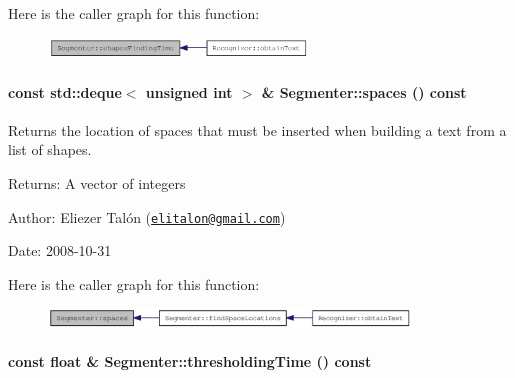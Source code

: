 Here is the caller graph for this function:\nopagebreak
\begin{figure}[H]
\begin{center}
\leavevmode
\includegraphics[width=196pt]{class_segmenter_8d7304b35b1891b1c7154a3ac2ff2c4b_icgraph}
\end{center}
\end{figure}
\hypertarget{class_segmenter_eed49de2d6548ae8016bf6c9c78cec99}{
\paragraph[{spaces}]{\setlength{\rightskip}{0pt plus 5cm}const std::deque$<$ unsigned int $>$ \& Segmenter::spaces () const}\hfill}
\label{class_segmenter_eed49de2d6548ae8016bf6c9c78cec99}


Returns the location of spaces that must be inserted when building a text from a list of shapes. 

\begin{Desc}
\item[Returns:]A vector of integers\end{Desc}
\begin{Desc}
\item[Author:]Eliezer Talón (\href{mailto:elitalon@gmail.com}{\tt elitalon@gmail.com}) \end{Desc}
\begin{Desc}
\item[Date:]2008-10-31 \end{Desc}


Here is the caller graph for this function:\nopagebreak
\begin{figure}[H]
\begin{center}
\leavevmode
\includegraphics[width=273pt]{class_segmenter_eed49de2d6548ae8016bf6c9c78cec99_icgraph}
\end{center}
\end{figure}
\hypertarget{class_segmenter_9114d0f3934b43478fb55077b7722d3d}{
\paragraph[{thresholdingTime}]{\setlength{\rightskip}{0pt plus 5cm}const float \& Segmenter::thresholdingTime () const}\hfill}
\label{class_segmenter_9114d0f3934b43478fb55077b7722d3d}


